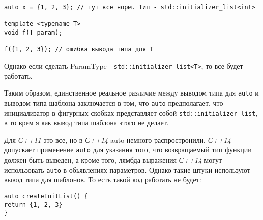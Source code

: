 \begin{verbatim}
auto x = {1, 2, 3}; // тут все норм. Тип - std::initializer_list<int>

template <typename T>
void f(T param);

f({1, 2, 3}); // ошибка вывода типа для T
\end{verbatim}
	
	Однако если сделать ParamType - \texttt{std::initializer_list<T>}, то все будет работать.
	
	Таким образом, единственное реальное различие между выводом типа для \texttt{auto} и выводом типа шаблона заключается в том, что \texttt{auto} предполагает, что инициализатор в фигурных скобках представляет собой \texttt{std::initializer_list}, в то врем я как вывод типа шаблона этого не делает.
	
	Для \textit{С++11} это все, но в \textit{С++14} auto немного распростронили.\textit{ С++14 }допускает применение \texttt{auto} для указания того, что возвращаемый тип функции должен быть выведен, а кроме того, лямбда-выражения \textit{С++14} могут использовать \texttt{auto} в обьявлениях параметров. Однако такие штуки используют вывод типа для шаблонов. То есть такой код работать не будет:
\begin{verbatim}
auto createInitList() {
return {1, 2, 3}
}
\end{verbatim}
	
